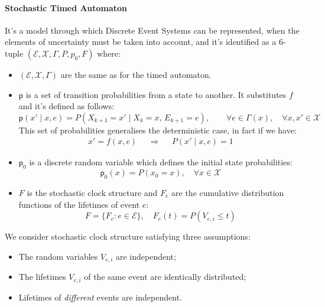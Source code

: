\documentclass[12pt,a4paper]{article}
\newcommand*{\transp}{\mathsf{p}}
\begin{document}
\paragraph{Stochastic Timed Automaton}
It’s a model through which Discrete Event Systems can be represented, when the elements of uncertainty must be taken into account, and it’s identified as a $6$-tuple $(\mathcal{E},\mathcal{X},\Gamma,P,p_0,F)$ where:
\begin{itemize}
\item $(\mathcal{E},\mathcal{X},\Gamma)$ are the same as for the timed automaton.
\item $\transp$ is a set of transition probabilities from a state to another. It substitutes $f$ and it’s defined as follows:
$$
\transp(x' \mid x,e) = P\left(X_{k+1} = x' \mid X_k = x, \, E_{k+1} = e\right), \qquad \forall e \in \Gamma(x) , \quad \forall x,x' \in \mathcal{X}
$$
This set of probabilities generalises the deterministic case, in fact if we have:
$$
\begin{matrix}
x'=f(x,e)&&\Rightarrow && P(x' \mid x,e)=1
\end{matrix}
$$
\item $\transp_0$ is a discrete random variable which defines the initial state probabilities:
$$
\transp_0(x)=P(x_0 = x), \quad \forall x\in \mathcal{X}
$$
\item $F$ is the stochastic clock structure and $F_e$ are the cumulative distribution functions of the lifetimes of event $e$:
$$
F = \{F_e : e \in \mathcal{E}\}, \quad F_e(t) = P(V_{e,i} \leq t)
$$
\end{itemize}
\noindent
We consider stochastic clock structure satisfying three assumptions:
\begin{itemize}
	\item The random variables $V_{e,i}$ are independent;
	\item The lifetimes $V_{e,i}$ of the same event are identically distributed;
	\item Lifetimes of \textit{different} events are independent.
\end{itemize}
\end{document}
